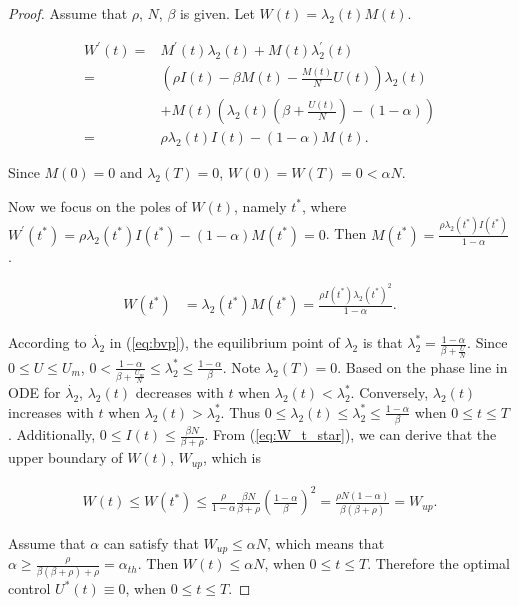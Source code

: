 \begin{proof}
Assume that $\rho$, $N$, $\beta$ is given.
Let $W(t) = \lambda_{2}(t)M(t)$.
\begin{small}
\begin{equation}
\label{eq:W_diff}
\begin{aligned}
W^{'}(t) =& M^{'}(t) \lambda_{2}(t) + M(t) \lambda_{2}^{'}(t)\\
=& (\rho I(t)  - \beta M(t) - \frac{M(t)}{N} U(t) )\lambda_{2}(t) \\
&+ M(t) (\lambda_{2}(t) (\beta + \frac{U(t)}{N} ) - (1-\alpha))\\
=& \rho \lambda_{2}(t) I(t) - (1-\alpha)M(t).
\end{aligned}
\end{equation}
\end{small}
Since $M(0)=0$ and $\lambda_{2}(T)=0$,
$W(0)=W(T)=0<\alpha N$.

Now we focus on the poles of $W(t)$, namely $t^{*}$,
where $W^{'}(t^{*})=\rho \lambda_{2}(t^{*}) I(t^{*}) - (1-\alpha)M(t^{*})=0$.
Then $M(t^{*}) = \frac{\rho \lambda_{2}(t^{*}) I(t^{*})}{1-\alpha}$.
\begin{small}
\begin{equation}
\label{eq:W_t_star}
\begin{aligned}
W(t^{*}) &= \lambda_{2}(t^{*}) M(t^{*}) = \frac{\rho I(t^{*}) \lambda_{2}(t^{*})^2}{1-\alpha}.
\end{aligned}
\end{equation}
\end{small}

According to $\dot{\lambda_{2}}$ in (\ref{eq:bvp}), 
the equilibrium point of $\lambda_{2}$ is that $\lambda_{2}^{*} = \frac{1-\alpha}{\beta+\frac{U}{N}}$.
Since $0 \le U \le U_{m}$, $0 < \frac{1-\alpha}{\beta+\frac{U_{m}}{N}} \le \lambda_{2}^{*} \le \frac{1-\alpha}{\beta}$.
Note $\lambda_{2}(T)=0$.
Based on the phase line in ODE for $\dot{\lambda_{2}}$,
$\lambda_{2}(t)$ decreases with $t$ when $\lambda_{2}(t) < \lambda_{2}^{*}$.
Conversely, $\lambda_{2}(t)$ increases with $t$ when $\lambda_{2}(t) > \lambda_{2}^{*}$.
Thus $0 \le \lambda_{2}(t) \le \lambda_{2}^{*} \le \frac{1-\alpha}{\beta}$ when $0 \le t \le T$.
Additionally, $0 \le I(t) \le \frac{\beta N}{\beta + \rho}$.
From (\ref{eq:W_t_star}), we can derive that the upper boundary of $W(t)$, $W_{up}$, which is
\begin{small}
\begin{equation}
\nonumber
\begin{aligned}
W(t) \le W(t^{*}) \le \frac{\rho}{1-\alpha} \frac{\beta N}{\beta + \rho} (\frac{1-\alpha}{\beta})^2 = \frac{\rho N (1-\alpha)}{\beta(\beta+\rho)} = W_{up}.
\end{aligned}
\end{equation}
\end{small}

Assume that $\alpha$ can satisfy that $W_{up} \le \alpha N$,
which means that $\alpha \ge \frac{\rho}{\beta(\beta+\rho)+\rho} = \alpha_{th}$.
Then $W(t) \le \alpha N$, when $0 \le t \le T$.
Therefore the optimal control $U^{*}(t) \equiv 0$, when $0 \le t \le T$.
\end{proof}
